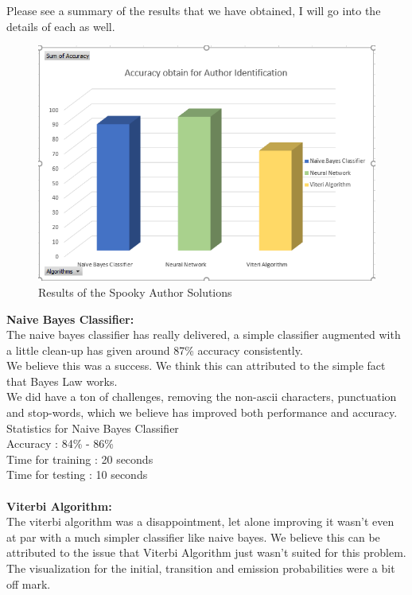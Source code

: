 \documentclass[fleqn,10pt]{SelfArx} %
\begin{document}
Please see a summary of the results that we have obtained, I will go into the details of each as well.\\
\begin{figure}[H]\centering
	\includegraphics[width=\linewidth]{Accuracy.PNG}
	\caption{Results of the Spooky Author Solutions}
	\label{fig:Results}
\end{figure}
\textbf{Naive Bayes Classifier:}\\
The naive bayes classifier has really delivered, a simple classifier augmented with a little clean-up has given around 87\% accuracy consistently.\\
We believe this was a success. We think this can attributed to the simple fact that Bayes Law works.\\
We did have a ton of challenges, removing the non-ascii characters, punctuation and stop-words, which we believe has improved both performance and accuracy.\\
Statistics for Naive Bayes Classifier\\
Accuracy : 84\% - 86\% \\
Time for training : 20 seconds \\
Time for testing : 10 seconds \\
\\
\textbf{Viterbi Algorithm: }\\
The viterbi algorithm was a disappointment, let alone improving it wasn't even at par with a much simpler classifier like naive bayes. We believe this can be attributed to the issue that Viterbi Algorithm just wasn't suited for this problem.\\
The visualization for the initial, transition and emission probabilities were a bit off mark.\\
\end{document}
